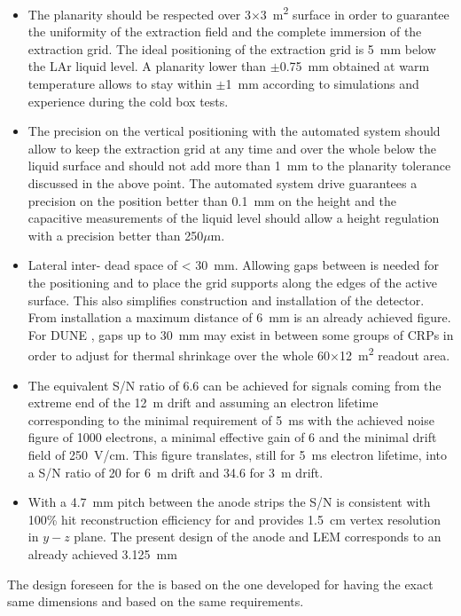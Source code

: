 \begin{itemize}
\item{The  planarity should be respected over \num{3}$\times$\SI{3}{\m^{2}} surface in order to guarantee the uniformity  of  the extraction field and the complete immersion of the extraction grid.  The ideal positioning of the 
extraction grid is \SI{5}{\mm} below the LAr liquid level. A planarity lower than $\pm$\SI{0.75}{\mm} obtained at  warm temperature  allows to stay within $\pm$\SI{1}{\mm} according to simulations and  experience during the  cold box tests. }

\item{The precision on the  vertical positioning with the automated system should allow to keep the extraction grid at any time and over the whole  below the liquid surface and should  not add more  than  \SI{1}{\mm} to the planarity tolerance discussed in the above point. The automated system drive guarantees a precision on the position better than \SI{0.1}{\mm} on the  height and the capacitive measurements of the liquid level should allow a height regulation  with a precision better than  \num{250}$\mu$m}.

\item{Lateral inter- dead space %
of < \SI{30}{mm}.
Allowing gaps between  is needed for the  positioning and to place the grid supports along the edges of the active  surface. This also simplifies construction and installation of the detector. From  installation a maximum distance of  \SI{6}{\mm}  is an already achieved figure. 
For DUNE , gaps up to \SI{30}{\mm} may  exist in between some groups of CRPs in order to adjust for thermal shrinkage over the whole  \num{60}$\times$\SI{12}{\m^{2}} readout area.}

\item{The equivalent S/N ratio of \num{6.6} can be achieved for signals  coming from the extreme end of the \SI{12}{\m} drift and assuming an electron lifetime corresponding to  the minimal requirement of \SI{5}{\ms} with the achieved noise figure of \num{1000} electrons, a minimal  effective  gain of \num{6} and the minimal drift field of \SI{250}{V/cm}. This figure translates, still for \SI{5}{\ms} electron lifetime, into a S/N ratio of  \num{20} for \SI{6}{\m} drift and \num{34.6} for \SI{3}{\m} drift. }

\item{With a \SI{4.7}{\mm} pitch between the anode strips the S/N is consistent with 100\% hit reconstruction  efficiency for   and provides \SI{1.5}{cm} vertex resolution in $y-z$ plane.
The present  design of the anode and LEM corresponds to an already achieved \SI{3.125}{\mm}}
\end{itemize}
The  design foreseen for the  is based on the one developed for  having the exact same dimensions and based on 
the same requirements.
